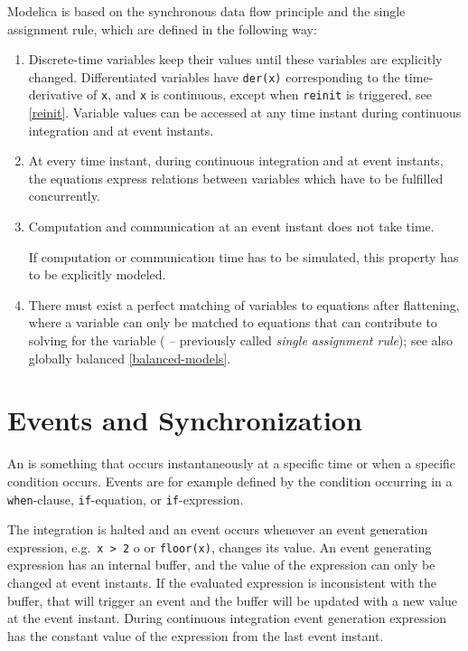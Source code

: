 Modelica is based on the synchronous data flow principle and the single assignment rule, which are defined in the following way:
\begin{enumerate}
\item Discrete-time variables keep their values until these variables are explicitly changed.
Differentiated variables have \lstinline!der(x)! corresponding to the time-derivative of \lstinline!x!,
and \lstinline!x! is continuous, except when \lstinline!reinit! is triggered, see \cref{reinit}.
Variable values can be accessed at any time instant during continuous integration and at event instants.

\item At every time instant, during continuous integration and at event instants,
the equations express relations between variables which have to be fulfilled concurrently.

\item Computation and communication at an event instant does not take time.
\begin{nonnormative}
If computation or communication time has to be simulated, this property has to be explicitly modeled.
\end{nonnormative}

\item There must exist a perfect matching of variables to equations after flattening, where a variable can only be matched to equations that can contribute to solving for the variable
( -- previously called \emph{single assignment rule}); see also globally balanced \cref{balanced-models}.
\end{enumerate}

\section{Events and Synchronization}\label{events-and-synchronization}

An  is something that occurs instantaneously at a specific time or when a specific condition occurs.
Events are for example defined by the condition occurring in a \lstinline!when!-clause, \lstinline!if!-equation, or \lstinline!if!-expression.

The integration is halted and an event occurs whenever an event generation expression, e.g.\ \lstinline!x > 2! o or \lstinline!floor(x)!, changes its value.
An event generating expression has an internal buffer, and the value of the expression can only be changed at event instants.
If the evaluated expression is inconsistent with the buffer, that will trigger an event and the buffer will be updated with a new value at the event instant.
During continuous integration event generation expression has the constant value of the expression from the last event instant.


